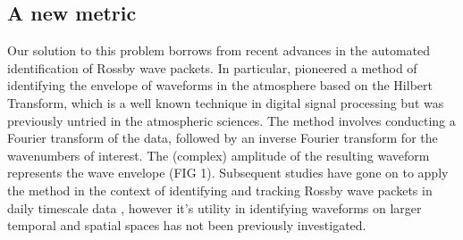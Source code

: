 \subsection{A new metric}

Our solution to this problem borrows from recent advances in the automated identification of Rossby wave packets. In particular, \citet{Zimin2003} pioneered a method of identifying the envelope of waveforms in the atmosphere based on the Hilbert Transform, which is a well known technique in digital signal processing but was previously untried in the atmospheric sciences. The method involves conducting a Fourier transform of the data, followed by an inverse Fourier transform for the wavenumbers of interest. The (complex) amplitude of the resulting waveform represents the wave envelope (FIG 1). Subsequent studies have gone on to apply the method in the context of identifying and tracking Rossby wave packets in daily timescale data \citep{Glatt2014,Souders2014a}, however it's utility in identifying waveforms on larger temporal and spatial spaces has not been previously investigated.   